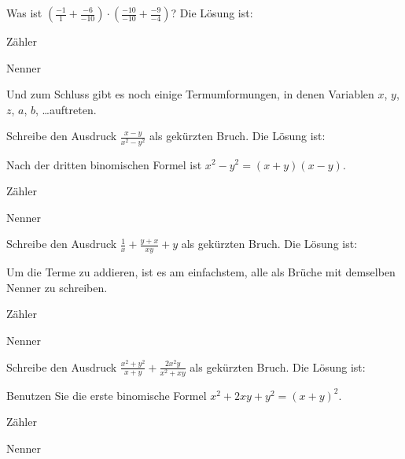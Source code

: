 \documentclass{ximera}
\begin{document}
\begin{shuffle}
\begin{question}
Was ist $(\frac{-1}{1}+\frac{-6}{-10})\cdot(\frac{-10}{-10}+\frac{-9}{-4})$?
Die Lösung ist:
\begin{solution}
Zähler 
\end{solution}
\begin{solution}
Nenner 
\end{solution}
\end{question}

\end{shuffle}



Und zum Schluss gibt es noch einige Termumformungen, in denen Variablen $x$, $y$, $z$, $a$, $b$, \dots auftreten. 

\begin{shuffle}
    
\begin{question}
Schreibe den Ausdruck $\frac{x-y}{x^2-y^2}$ als gekürzten Bruch.
Die Lösung ist:
\begin{solution}
\begin{hint}
Nach der dritten binomischen Formel ist $x^2-y^2 = (x+y)(x-y)$.
\end{hint}
Zähler 
\end{solution}
\begin{solution}
Nenner 
\end{solution}
\end{question}

\begin{question}
Schreibe den Ausdruck $\frac{1}{x} + \frac{y+x}{xy} + y$ als gekürzten Bruch.
Die Lösung ist:
\begin{solution}
\begin{hint}
Um die Terme zu addieren, ist es am einfachstem, alle als Brüche mit demselben Nenner zu schreiben.
\end{hint}
Zähler 
\end{solution}
\begin{solution}
Nenner 
\end{solution}
\end{question}

\begin{question}
Schreibe den Ausdruck $\frac{x^2+y^2}{x+y} + \frac{2x^2y}{x^2+xy}$ als gekürzten Bruch.
Die Lösung ist:
\begin{solution}
\begin{hint}
Benutzen Sie die erste binomische Formel $x^2+2xy+y^2 = (x+y)^2$.
\end{hint}
Zähler 
\end{solution}
\begin{solution}
Nenner 
\end{solution}
\end{question}


\end{shuffle}
\end{document}
